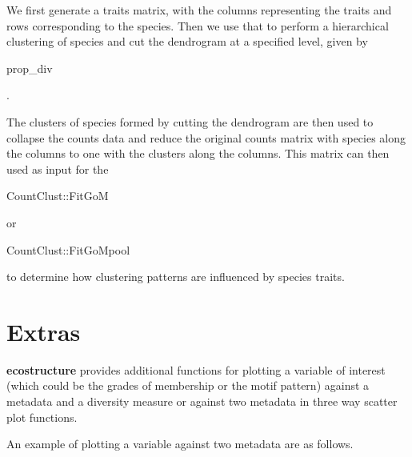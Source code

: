 \documentclass[12pt]{article}\usepackage[]{graphicx}\usepackage[usenames,dvipsnames]{color}
\begin{document}
We first generate a traits matrix, with the columns representing the traits and rows corresponding to the species. Then we use that to perform a hierarchical clustering of species and cut the dendrogram at a specified level, given by  \begin{verb} prop_div \end{verb}.

The clusters of species formed by cutting the dendrogram are then used to collapse the counts data and reduce the original counts matrix with species along the columns to one with the clusters along the columns. This matrix can then used as input for the \begin{verb} CountClust::FitGoM \end{verb} or \begin{verb} CountClust::FitGoMpool \end{verb}  to determine how clustering patterns are influenced by species traits.

\section{Extras}

\textbf{ecostructure} provides additional functions for plotting a variable of interest (which could be the grades of membership or the motif pattern) against a metadata and a diversity measure or against two metadata in three way scatter plot functions.

An example of plotting a variable against two metadata are as follows.
\end{document}
